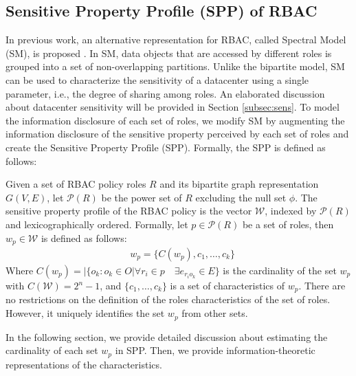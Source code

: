 \subsection{Sensitive Property Profile (SPP) of RBAC}

In previous work, an alternative representation for RBAC, called Spectral Model (SM), is proposed \cite{almutairi2015risk}. In SM, data objects that are accessed by different roles is grouped into a set of non-overlapping partitions. Unlike the bipartite model, SM can be used to characterize the sensitivity of a datacenter using a single parameter, i.e., the degree of sharing among roles. An elaborated discussion about datacenter sensitivity will be provided in Section \ref{subsec:sens}. To model the information disclosure of each set of roles, we modify SM by augmenting the information disclosure of the sensitive property perceived by each set of roles and create the Sensitive Property Profile (SPP). Formally, the SPP is defined as follows:

\begin{definition}
Given a set of RBAC policy roles $R$ and its bipartite graph representation $G(V,E)$, let $\mathcal{P}(R)$ be the power set of $R$ excluding the null set  $\phi$. The sensitive property profile of the RBAC policy is the vector  $\mathcal{W}$, indexed by $\mathcal{P}(R)$ and lexicographically ordered. Formally, let $p \in \mathcal{P}(R)$ be a set of roles, then $w_p \in \mathcal{W}$ is defined as follows:
\begin{equation}
\begin{split}
&w_p= \{ C(w_p), c_1,\dots, c_{k} \} \nonumber
\end{split}
\end{equation}  
Where $C(w_p) = |\{o_k : o_k \in O | \forall r_i \in p \quad \exists  e_{r_i o_k} \in E \}$ is the cardinality of the set $w_p$ with $C(\mathcal{W}) = 2^n -1$, and $\{ c_1,\dots,c_k\}$ is a set of characteristics of $w_p$. There are no restrictions on the definition of the roles characteristics of the set of roles. However, it uniquely identifies the set $w_p$ from other sets.
\end{definition}  

In the following section, we provide detailed discussion about estimating the cardinality of each set $w_p$ in SPP. Then, we provide information-theoretic representations of the characteristics.

